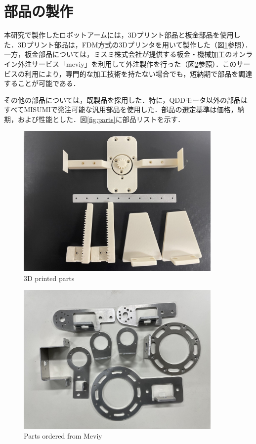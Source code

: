 \section{部品の製作}
本研究で製作したロボットアームには，3Dプリント部品と板金部品を使用した．3Dプリント部品は，FDM方式の3Dプリンタを用いて製作した（図\ref{fig:3Dprint}参照）．一方，板金部品については，ミスミ株式会社が提供する板金・機械加工のオンライン外注サービス「meviy」\cite{meviy:online}を利用して外注製作を行った（図\ref{fig:meviy}参照）．このサービスの利用により，専門的な加工技術を持たない場合でも，短納期で部品を調達することが可能である．

その他の部品については，既製品を採用した．特に，QDDモータ以外の部品はすべてMISUMI\cite{misumi:online}で発注可能な汎用部品を使用した．部品の選定基準は価格，納期，および性能とした．図\ref{fig:parts}に部品リストを示す．
\begin{figure}
  \centering
  \includegraphics[width=10cm]{images/product/3Dprint.jpg}
  \caption{3D printed parts}
  \label{fig:3Dprint}
\end{figure}
\begin{figure}
  \centering
  \includegraphics[width=10cm]{images/product/meviy.jpg}
  \caption{Parts ordered from Meviy}
  \label{fig:meviy}
\end{figure}
